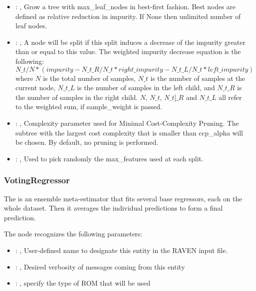 \begin{itemize}
    \item {}: , 
      Grow a tree with max\_leaf\_nodes in best-first fashion. Best nodes are defined as relative
      reduction                                                  in impurity. If None then unlimited
      number of leaf nodes.

    \item {}: , 
      A node will be split if this split induces a decrease of the impurity greater than or equal to
      this value.                                                  The weighted impurity decrease
      equation is the following:                                                  $N\_t / N *
      (impurity - N\_t\_R / N\_t * right\_impurity - N\_t\_L / N\_t * left\_impurity)$
      where $N$ is the total number of samples, $N\_t$ is the number of samples at the current node,
      $N\_t\_L$ is the number                                                  of samples in the
      left child, and $N\_t\_R$ is the number of samples in the right child.
      $N$, $N\_t$, $N\_t]\_R$ and $N\_t\_L$ all refer to the weighted sum, if sample\_weight is
      passed.

    \item {}: , 
      Complexity parameter used for Minimal Cost-Complexity Pruning. The subtree with the largest
      cost                                                  complexity that is smaller than
      ccp\_alpha will be chosen. By default, no pruning is performed.

    \item {}: , 
      Used to pick randomly the max\_features used at each split.
  \end{itemize}


\subsubsection{VotingRegressor}
  The  is an ensemble meta-estimator that fits several base
  regressors, each on the whole dataset. Then it averages the individual predictions to form
  a final prediction.

  The  node recognizes the following parameters:
    \begin{itemize}
      \item {}: , 
        User-defined name to designate this entity in the RAVEN input file.
      \item {}: , 
        Desired verbosity of messages coming from this entity
      \item {}: , 
        specify the type of ROM that will be used
  \end{itemize}

